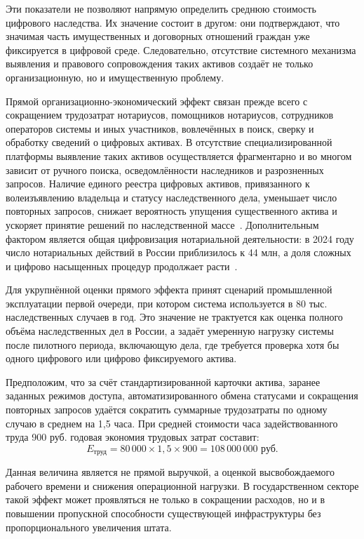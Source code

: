 Эти показатели не позволяют напрямую определить среднюю стоимость цифрового наследства. Их значение состоит в другом: они подтверждают, что значимая часть имущественных и договорных отношений граждан уже фиксируется в цифровой среде. Следовательно, отсутствие системного механизма выявления и правового сопровождения таких активов создаёт не только организационную, но и имущественную проблему.

Прямой организационно-экономический эффект связан прежде всего с сокращением трудозатрат нотариусов, помощников нотариусов, сотрудников операторов системы и иных участников, вовлечённых в поиск, сверку и обработку сведений о цифровых активах. В отсутствие специализированной платформы выявление таких активов осуществляется фрагментарно и во многом зависит от ручного поиска, осведомлённости наследников и разрозненных запросов. Наличие единого реестра цифровых активов, привязанного к волеизъявлению владельца и статусу наследственного дела, уменьшает число повторных запросов, снижает вероятность упущения существенного актива и ускоряет принятие решений по наследственной массе~\cite{Haritonova2024HSE, RUFADAA2015}. Дополнительным фактором является общая цифровизация нотариальной деятельности: в 2024 году число нотариальных действий в России приблизилось к 44 млн, а доля сложных и цифрово насыщенных процедур продолжает расти~\cite{cniNotariat2024Stats}.

Для укрупнённой оценки прямого эффекта принят сценарий промышленной эксплуатации первой очереди, при котором система используется в 80 тыс. наследственных случаев в год. Это значение не трактуется как оценка полного объёма наследственных дел в России, а задаёт умеренную нагрузку системы после пилотного периода, включающую дела, где требуется проверка хотя бы одного цифрового или цифрово фиксируемого актива.

Предположим, что за счёт стандартизированной карточки актива, заранее заданных режимов доступа, автоматизированного обмена статусами и сокращения повторных запросов удаётся сократить суммарные трудозатраты по одному случаю в среднем на 1{,}5 часа. При средней стоимости часа задействованного труда 900 руб. годовая экономия трудовых затрат составит:
\begin{equation}
E_{\text{труд}} = 80\,000 \times 1{,}5 \times 900 = 108\,000\,000 \text{ руб.}
\label{eq:labor-effect}
\end{equation}

Данная величина является не прямой выручкой, а оценкой высвобождаемого рабочего времени и снижения операционной нагрузки. В государственном секторе такой эффект может проявляться не только в сокращении расходов, но и в повышении пропускной способности существующей инфраструктуры без пропорционального увеличения штата.

